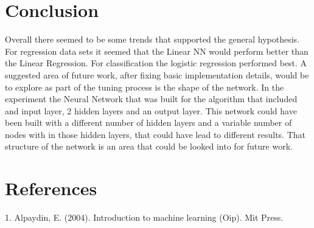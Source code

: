 \documentclass[twoside,11pt]{article}
\begin{document}
\section{Conclusion}
\hspace*{10mm} Overall there seemed to be some trends that supported the general hypothesis. For regression data sets it seemed that the Linear NN would perform better than the Linear Regression. For classification the logistic regression performed best.\newline
\hspace*{10mm} A suggested area of future work, after fixing basic implementation details, would be to explore as part of the tuning process is the shape of the network. In the experiment the Neural Network that was built for the algorithm that included and input layer, 2 hidden layers and an output layer. This network could have been built with a different number of hidden layers and a variable number of nodes with in those hidden layers, that could have lead to different results. That structure of the network is an area that could be looked into for future work. \newline

\section{References}
1. Alpaydin, E. (2004). Introduction to machine learning (Oip). Mit Press. 

\newpage
\end{document}
